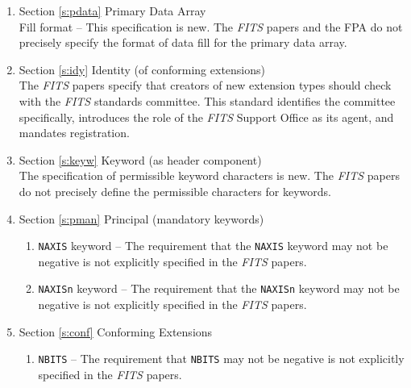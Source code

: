 \begin{enumerate}
\begin{description}
 \end{description}

\item Section \ref{s:pdata} Primary Data Array\\
     Fill format -- This 
     specification is new.  The {\em FITS\/} papers 
     and the FPA do not precisely specify 
     the format of data fill for the primary data array.

\item Section \ref{s:idy} Identity (of conforming extensions)\\
     The {\em FITS\/} papers specify that creators of
     new
     extension types
     should check with the {\em FITS\/} standards committee.  
     This standard identifies the committee specifically, 
     introduces the role of the {\em FITS\/} Support 
     Office as 
     its agent, and mandates registration.

\item Section \ref{s:keyw} Keyword (as header component)\\
     The specification of permissible keyword characters is new.
     The {\em FITS\/} papers do not precisely define the permissible 
     characters for keywords.

\item Section \ref{s:pman} Principal (mandatory keywords)

 \begin{enumerate}

 \item {\tt NAXIS} keyword -- The 
     requirement that the {\tt NAXIS} keyword
     may not be negative is not explicitly specified in 
     the {\em FITS\/} papers.  

 \item {\tt NAXISn} keyword -- The requirement that 
     the {\tt NAXISn} keyword may not be negative
     is not explicitly specified in the {\em FITS\/} papers.  

 \end{enumerate} 


\item Section \ref{s:conf} Conforming Extensions

 \begin{enumerate}

 \item {\tt NBITS} -- The requirement
     that 
     {\tt NBITS} may not be negative
     is not explicitly specified in the {\em FITS\/} papers.  


\end{enumerate}
\end{enumerate}
